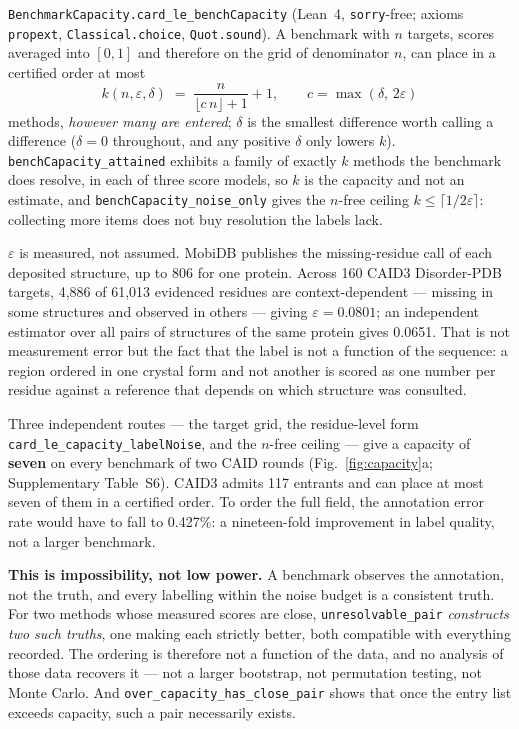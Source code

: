 \documentclass[11pt,a4paper]{article}
\newcommand{\eps}{\varepsilon}
\newcommand{\code}[1]{\texttt{\small #1}}
\begin{document}
\code{BenchmarkCapacity.card\_le\_benchCapacity} (Lean~4, \code{sorry}-free;
axioms \code{propext}, \code{Classical.choice}, \code{Quot.sound}). A benchmark
with $n$ targets, scores averaged into $[0,1]$ and therefore on the grid of
denominator $n$, can place in a certified order at most
\[
  k(n,\eps,\delta) \;=\; \frac{n}{\lfloor c\,n\rfloor + 1} + 1,
  \qquad c = \max(\delta,\, 2\eps)
\]
methods, \emph{however many are entered}; $\delta$ is the smallest difference
worth calling a difference ($\delta = 0$ throughout, and any positive $\delta$
only lowers $k$). \code{benchCapacity\_attained} exhibits a family of exactly
$k$ methods the benchmark does resolve, in each of three score models, so $k$ is
the capacity and not an estimate, and \code{benchCapacity\_noise\_only} gives the
$n$-free ceiling $k \le \lceil 1/2\eps \rceil$: collecting more items does not
buy resolution the labels lack.

$\eps$ is measured, not assumed. MobiDB\cite{mobidb} publishes the
missing-residue call of each deposited structure, up to 806 for one protein.
Across 160 CAID3 Disorder-PDB targets, 4{,}886 of 61{,}013 evidenced residues
are context-dependent --- missing in some structures and observed in others ---
giving $\eps = 0.0801$; an independent estimator over all pairs of structures of
the same protein gives 0.0651. That is not measurement error but the fact that
the label is not a function of the sequence: a region ordered in one crystal
form and not another is scored as one number per residue against a reference
that depends on which structure was consulted.

Three independent routes --- the target grid, the residue-level form
\code{card\_le\_capacity\_labelNoise}, and the $n$-free ceiling --- give a
capacity of \textbf{seven} on every benchmark of two CAID rounds
(Fig.~\ref{fig:capacity}a; Supplementary Table~S6). CAID3 admits 117 entrants
and can place at most seven of them in a certified order. To order the full
field, the annotation error rate would have to fall to 0.427\%: a nineteen-fold
improvement in label quality, not a larger benchmark.

\textbf{This is impossibility, not low power.} A benchmark observes the
annotation, not the truth, and every labelling within the noise budget is a
consistent truth. For two methods whose measured scores are close,
\code{unresolvable\_pair} \emph{constructs two such truths}, one making each
strictly better, both compatible with everything recorded. The ordering is
therefore not a function of the data, and no analysis of those data recovers it
--- not a larger bootstrap, not permutation testing, not Monte Carlo. And
\code{over\_capacity\_has\_close\_pair} shows that once the entry list exceeds
capacity, such a pair necessarily exists.
\end{document}
